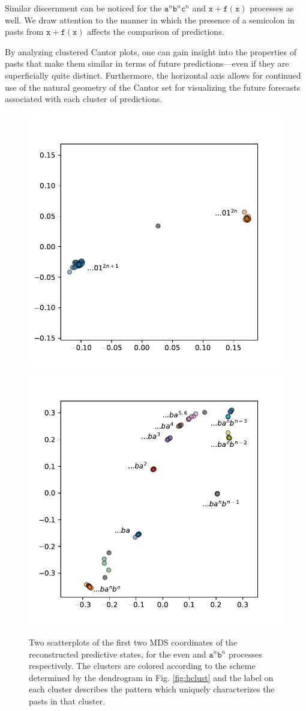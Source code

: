 \documentclass[sigconf, anonymous, review]{acmart}
\begin{document}
Similar discernment can be noticed for the $\mathtt{a}^n \mathtt{b}^n
\mathtt{c}^n$ and $\mathtt{x+f(x)}$ processes as well. We draw attention to the
manner in which the presence of a semicolon in pasts from $\mathtt{x+f(x)}$
affects the comparison of predictions.

By analyzing clustered Cantor plots, one can gain insight into the properties of
pasts that make them similar in terms of future predictions---even if they are
superficially quite distinct. Furthermore, the horizontal axis allows for
continued use of the natural geometry of the Cantor set for visualizing the
future forecasts associated with each cluster of predictions.

\begin{figure}[ht]
  \centering
  \includegraphics[width=0.45\linewidth]{../plots/even_MDS.pdf}
  \includegraphics[width=0.45\linewidth]{../plots/anbn_MDS.pdf}
  \caption{Two scatterplots of the first two MDS coordinates of the
  reconstructed predictive states, for the even and $\mathtt{a}^n\mathtt{b}^n$
  processes respectively. The clusters are colored according to the scheme
  determined by the dendrogram in Fig. \ref{fig:hclust} and the label on each
  cluster describes the pattern which uniquely characterizes the pasts in that cluster.}
    \label{fig:mds}
\end{figure}
\end{document}
